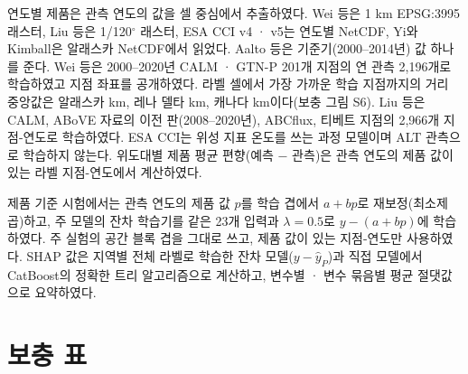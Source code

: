 \documentclass[pdflatex,sn-nature]{sn-jnl}
\begin{document}
연도별 제품은 관측 연도의 값을 셀 중심에서 추출하였다. Wei 등\cite{Wei2026}은 1 km EPSG:3995 래스터, Liu 등\cite{Liu2024}은 1/120$^\circ$ 래스터, ESA CCI v4 · v5\cite{Westermann2024,Westermann2025}는 연도별 NetCDF, Yi와 Kimball\cite{YiKimball2019}은 알래스카 NetCDF에서 읽었다. Aalto 등\cite{Aalto2018}은 기준기(2000--2014년) 값 하나를 준다. Wei 등은 2000--2020년 CALM · GTN-P 201개 지점의 연 관측 2,196개로 학습하였고 지점 좌표를 공개하였다. 라벨 셀에서 가장 가까운 학습 지점까지의 거리 중앙값은 알래스카 \ndistweiAkmed{} km, 레나 델타 \ndistweiLemed{} km, 캐나다 \ndistweiCamed{} km이다(보충 그림 S6). Liu 등은 CALM, ABoVE 자료의 이전 판(2008--2020년), ABCflux, 티베트 지점의 2,966개 지점-연도로 학습하였다. ESA CCI는 위성 지표 온도를 쓰는 과정 모델이며 ALT 관측으로 학습하지 않는다. 위도대별 제품 평균 편향(예측 − 관측)은 관측 연도의 제품 값이 있는 라벨 지점-연도에서 계산하였다.

제품 기준 시험에서는 관측 연도의 제품 값 $p$를 학습 겹에서 $a+bp$로 재보정(최소제곱)하고, 주 모델의 잔차 학습기를 같은 23개 입력과 $\lambda=0.5$로 $y-(a+bp)$에 학습하였다. 주 실험의 공간 블록 겹을 그대로 쓰고, 제품 값이 있는 지점-연도만 사용하였다. SHAP 값\cite{Lundberg2017}은 지역별 전체 라벨로 학습한 잔차 모델($y-\hat{y}_P$)과 직접 모델에서 CatBoost의 정확한 트리 알고리즘으로 계산하고, 변수별 · 변수 묶음별 평균 절댓값으로 요약하였다.

\section{보충 표}
\end{document}
